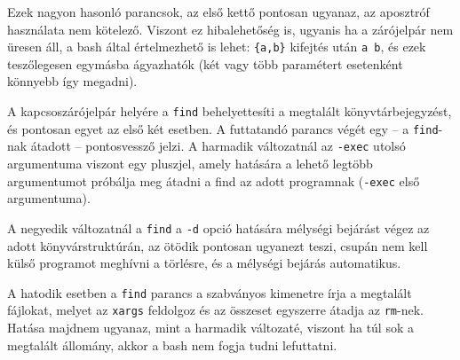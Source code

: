 Ezek nagyon hasonló parancsok, az első kettő pontosan ugyanaz, az aposztróf
használata nem kötelező. Viszont ez hibalehetőség is, ugyanis ha a zárójelpár
nem üresen áll, a bash által értelmezhető is lehet: \texttt{\{a,b\}} kifejtés
után \texttt{a b}, és ezek teszőlegesen egymásba ágyazhatók (két vagy több
paramétert esetenként könnyebb így megadni).

A kapcsoszárójelpár helyére a \texttt{find} behelyettesíti a megtalált
könyvtárbejegyzést, és pontosan egyet az első két esetben. A futtatandó parancs
végét egy -- a \texttt{find}-nak átadott -- pontosvessző jelzi. A harmadik
változatnál az \texttt{-exec} utolsó argumentuma viszont egy pluszjel, amely
hatására a lehető legtöbb argumentumot próbálja meg átadni a find az adott
programnak (\texttt{-exec} első argumentuma).

A negyedik változatnál a \texttt{find} a \texttt{-d} opció hatására mélységi
bejárást végez az adott könyvárstruktúrán, az ötödik pontosan ugyanezt teszi,
csupán nem kell külső programot meghívni a törlésre, és a mélységi bejárás
automatikus.

A hatodik esetben a \texttt{find} parancs a szabványos kimenetre írja a
megtalált fájlokat, melyet az \texttt{xargs} feldolgoz és az összeset egyszerre
átadja az \texttt{rm}-nek. Hatása majdnem ugyanaz, mint a harmadik változaté,
viszont ha túl sok a megtalált állomány, akkor a bash nem fogja tudni
lefuttatni.





